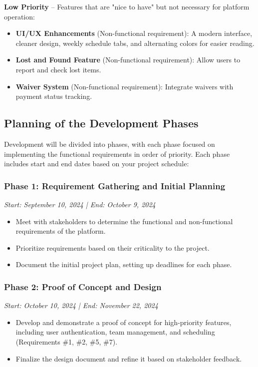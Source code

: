 \documentclass[12pt, titlepage]{article}
\begin{document}
\textbf{Low Priority} – Features that are "nice to have" but not necessary for platform operation:
\begin{itemize}
    \item \textbf{UI/UX Enhancements} (Non-functional requirement): A modern interface, cleaner design, weekly schedule tabs, and alternating colors for easier reading.
    \item \textbf{Lost and Found Feature} (Non-functional requirement): Allow users to report and check lost items.
    \item \textbf{Waiver System} (Non-functional requirement): Integrate waivers with payment status tracking.
\end{itemize}

\subsection{Planning of the Development Phases}
Development will be divided into phases, with each phase focused on implementing the functional requirements in order of priority. Each phase includes start and end dates based on your project schedule:

\subsubsection{Phase 1: Requirement Gathering and Initial Planning}
\textit{Start: September 10, 2024 | End: October 9, 2024}
\begin{itemize}
    \item Meet with stakeholders to determine the functional and non-functional requirements of the platform.
    \item Prioritize requirements based on their criticality to the project.
    \item Document the initial project plan, setting up deadlines for each phase.
\end{itemize}

\subsubsection{Phase 2: Proof of Concept and Design}
\textit{Start: October 10, 2024 | End: November 22, 2024}
\begin{itemize}
    \item Develop and demonstrate a proof of concept for high-priority features, including user authentication, team management, and scheduling (Requirements \#1, \#2, \#5, \#7).
    \item Finalize the design document and refine it based on stakeholder feedback.
\end{itemize}
\end{document}
